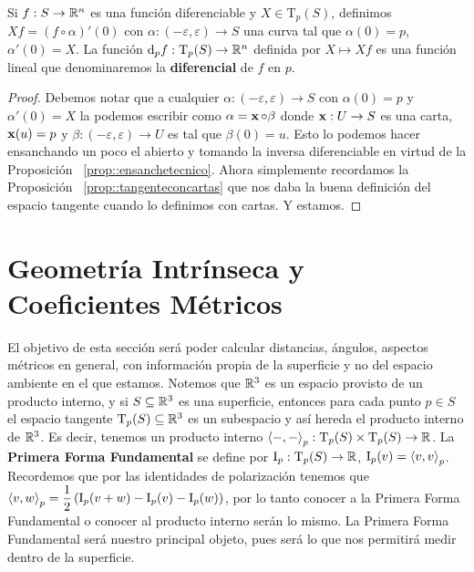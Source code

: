 \begin{prop}
Si $f:S\to\mathbb{R}^n$ es una función diferenciable y $X\in\mathrm{T}_p(S)$, definimos $Xf=(f\circ\alpha)'(0)$ con $\alpha:(-\varepsilon,\varepsilon)\to S$ una curva tal que $\alpha(0)=p$, $\alpha'(0)=X$. La función $\mathop{}\!\mathrm{d}_p f:\mathrm{T}_p(S)\to\mathbb{R}^n$ definida por $X\mapsto Xf$ es una función lineal que denominaremos la \textbf{diferencial} de $f$ en $p$.
\begin{proof}
Debemos notar que a cualquier $\alpha:(-\varepsilon,\varepsilon)\to S$ con $\alpha(0)=p$ y $\alpha'(0)=X$ la podemos escribir como $\alpha=\operatorname{\mathbf{x}}\circ\beta$ donde $\operatorname{\mathbf{x}}:U\to S$ es una carta, $\operatorname{\mathbf{x}}(u)=p$ y $\beta:(-\varepsilon,\varepsilon)\to U$ es tal que $\beta(0)=u$. Esto lo podemos hacer ensanchando un poco el abierto y tomando la inversa diferenciable en virtud de la Proposición ~\ref{prop::ensanchetecnico}. Ahora simplemente recordamos la Proposición ~\ref{prop::tangenteconcartas} que nos daba la buena definición del espacio tangente cuando lo definimos con cartas. Y estamos.
\end{proof}
\end{prop}

\section{Geometría Intrínseca y Coeficientes Métricos}

El objetivo de esta sección será poder calcular distancias, ángulos, aspectos métricos en general, con información propia de la superficie y no del espacio ambiente en el que estamos. Notemos que $\mathbb{R}^3$ es un espacio provisto de un producto interno, y si $S\subseteq\mathbb{R}^3$ es una superficie, entonces para cada punto $p\in S$ el espacio tangente $\mathrm{T}_p(S)\subseteq\mathbb{R}^3$ es un subespacio y así hereda el producto interno de $\mathbb{R}^3$. Es decir, tenemos un producto interno $\left\langle -,- \right\rangle_p:\mathrm{T}_p(S)\times\mathrm{T}_p(S)\to\mathbb{R}$. La \textbf{Primera Forma Fundamental} se define por $\mathrm{I}_p:\mathrm{T}_p(S)\to\mathbb{R}$, $\mathrm{I}_p(v)=\left\langle v,v \right\rangle_p$. Recordemos que por las identidades de polarización tenemos que $\left\langle v,w \right\rangle_p = \dfrac{1}{2}\left(\mathrm{I}_p(v+w)-\mathrm{I}_p(v)-\mathrm{I}_p(w) \right)$, por lo tanto conocer a la Primera Forma Fundamental o conocer al producto interno serán lo mismo. La Primera Forma Fundamental será nuestro principal objeto, pues será lo que nos permitirá medir dentro de la superficie.

